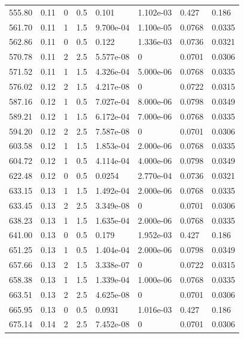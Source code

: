 \documentclass[preview]{standalone}
\begin{document}
{{{\begin{tabular}{L{1.2cm}C{1.2cm} C{0.3cm}C{0.5cm} C{1.4cm}C{1.4cm} C{1.4cm}C{1.4cm}}
  555.80  &  0.11  & 0     & 0.5 &  0.101  & 1.102e-03  & 0.427 &  0.186   \\ 
  561.70  &  0.11  & 1     & 1.5 &  9.700e-04  & 1.100e-05  & 0.0768 &  0.0335   \\ 
  562.86  &  0.11  & 0     & 0.5 &  0.122  & 1.336e-03  & 0.0736 &  0.0321   \\ 
  570.78  &  0.11  & 2     & 2.5 &  5.577e-08  & 0  & 0.0701 &  0.0306   \\ 
  571.52  &  0.11  & 1     & 1.5 &  4.326e-04  & 5.000e-06  & 0.0768 &  0.0335   \\ 
  576.02  &  0.12  & 2     & 1.5 &  4.217e-08  & 0  & 0.0722 &  0.0315   \\ 
  587.16  &  0.12  & 1     & 0.5 &  7.027e-04  & 8.000e-06  & 0.0798 &  0.0349   \\ 
  589.21  &  0.12  & 1     & 1.5 &  6.172e-04  & 7.000e-06  & 0.0768 &  0.0335   \\ 
  594.20  &  0.12  & 2     & 2.5 &  7.587e-08  & 0  & 0.0701 &  0.0306   \\ 
  603.58  &  0.12  & 1     & 1.5 &  1.853e-04  & 2.000e-06  & 0.0768 &  0.0335   \\ 
  604.72  &  0.12  & 1     & 0.5 &  4.114e-04  & 4.000e-06  & 0.0798 &  0.0349   \\ 
  622.48  &  0.12  & 0     & 0.5 &  0.0254  & 2.770e-04  & 0.0736 &  0.0321   \\ 
  633.15  &  0.13  & 1     & 1.5 &  1.492e-04  & 2.000e-06  & 0.0768 &  0.0335   \\ 
  633.45  &  0.13  & 2     & 2.5 &  3.349e-08  & 0  & 0.0701 &  0.0306   \\ 
  638.23  &  0.13  & 1     & 1.5 &  1.635e-04  & 2.000e-06  & 0.0768 &  0.0335   \\ 
  641.00  &  0.13  & 0     & 0.5 &  0.179  & 1.952e-03  & 0.427 &  0.186   \\ 
  651.25  &  0.13  & 1     & 0.5 &  1.404e-04  & 2.000e-06  & 0.0798 &  0.0349   \\ 
  657.66  &  0.13  & 2     & 1.5 &  3.338e-07  & 0  & 0.0722 &  0.0315   \\ 
  658.38  &  0.13  & 1     & 1.5 &  1.339e-04  & 1.000e-06  & 0.0768 &  0.0335   \\ 
  663.51  &  0.13  & 2     & 2.5 &  4.625e-08  & 0  & 0.0701 &  0.0306   \\ 
  665.95  &  0.13  & 0     & 0.5 &  0.0931  & 1.016e-03  & 0.427 &  0.186   \\ 
  675.14  &  0.14  & 2     & 2.5 &  7.452e-08  & 0  & 0.0701 &  0.0306   \\ 

\end{tabular}}}}
\end{document}

